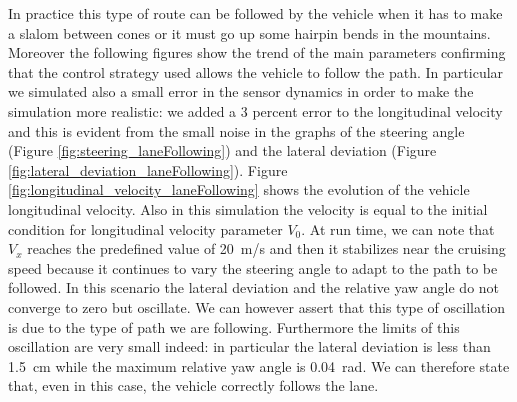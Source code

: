 In practice this type of route can be followed by the vehicle when it has to make a slalom between cones or it must go up some hairpin bends in the mountains. Moreover the following figures show the trend of the main parameters confirming that the control strategy used allows the vehicle to follow the path. In particular we simulated also a small error in the sensor dynamics in order to make the simulation more realistic: we added a 3 percent error to the longitudinal velocity and this is evident from the small noise in the graphs of the steering angle (Figure \ref{fig:steering_laneFollowing}) and the lateral deviation (Figure \ref{fig:lateral_deviation_laneFollowing}).
Figure {\ref{fig:longitudinal_velocity_laneFollowing}} shows the evolution of the vehicle longitudinal velocity. Also in this simulation the velocity is equal to the initial condition for longitudinal velocity parameter $V_0$. At run time, we can note that $V_x$ reaches the predefined value of \SI{20}{m/s} and then it stabilizes near the cruising speed because it continues to vary the steering angle to adapt to the path to be followed. In this scenario the lateral deviation and the relative yaw angle do not converge to zero but oscillate. We can however assert that this type of oscillation is due to the type of path we are following. Furthermore the limits of this oscillation are very small indeed: in particular the lateral deviation is less than \SI{1.5}{cm} while the maximum relative yaw angle is \SI{0.04}{rad}. We can therefore state that, even in this case, the vehicle correctly follows the lane.
